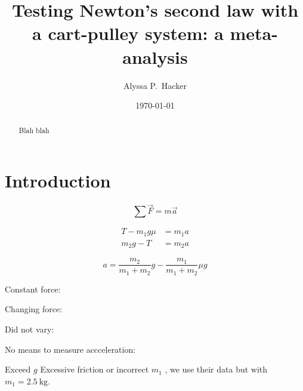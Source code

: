 \documentclass[reprint,amsmath,amssymb,aps,twoside]{revtex4-2}
\begin{document}
\setcounter{page}{1}
\title{Testing Newton's second law with a cart-pulley system: a meta-analysis}

\author{Alyssa P.~Hacker}
\date{\today}

\begin{abstract}
Blah blah
\end{abstract}


\maketitle\thispagestyle{mytitlepage}





\section{Introduction}
\begin{equation}
\sum\vec{F} = m\vec{a}
\label{eq:n2l}
\end{equation}

\begin{align}
T - m_1 g \mu &= m_1 a \\
m_2 g - T &= m_2 a 
\end{align}

\cite{tipler,barrons}
\begin{equation}
a = \dfrac{m_2}{m_1+m_2} g - \dfrac{m_1}{m_1+m_2} \mu g
\end{equation}

Constant force: \cite{arenas-2024-testing,avalur-2024-verifying,canada-2024-experimental,kishore-2024-relationship,yagnyeshwaran-2024-verifying}

Changing force: \cite{govardhanen-2024-newtons,kedharnath-2024-examining,krasnopolsky-2024-testing}

Did not vary: \cite{perle-2024-experimental}

No means to measure accceleration: \cite{barone-2024-investigating}

Exceed $g$ \cite{krasnopolsky-2024-testing}
Excessive friction or incorrect $m_1$ \cite{govardhanen-2024-newtons}, we use their data but with $m_1=\qty{2.5}{\kilo\gram}$.
\end{document}
